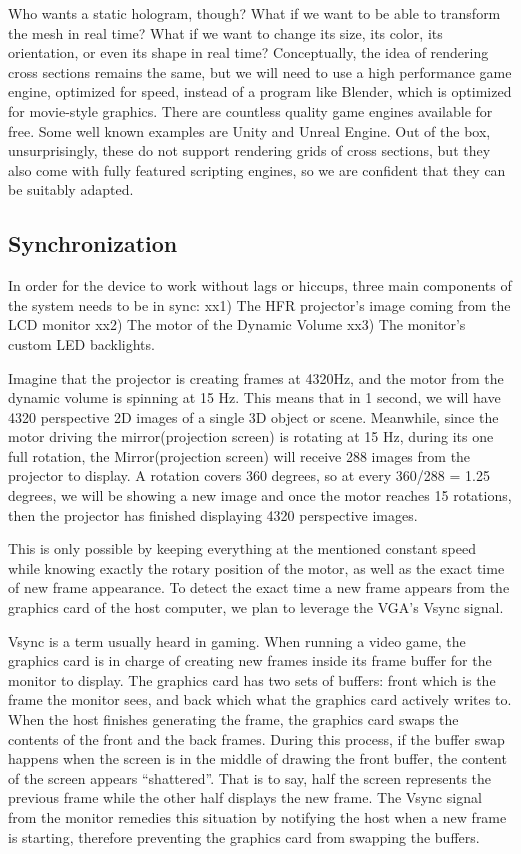 \documentclass[12pt]{article}
\begin{document}
Who wants a static hologram, though? What if we want to be able to transform the mesh in real time? What if we want to change its size, its color, its orientation, or even its shape in real time? Conceptually, the idea of rendering cross sections remains the same, but we will need to use a high performance game engine, optimized for speed, instead of a program like Blender, which is optimized for movie-style graphics. There are countless quality game engines available for free. Some well known examples are Unity and Unreal Engine. Out of the box, unsurprisingly, these do not support rendering grids of cross sections, but they also come with fully featured scripting engines, so we are confident that they can be suitably adapted.

\subsection{Synchronization}
In order for the device to work without lags or hiccups, three main components of the system needs to be in sync: 
xx1) The HFR projector’s image coming from the LCD monitor
xx2) The motor of the Dynamic Volume
xx3) The monitor’s custom LED backlights.

Imagine that the projector is creating frames at 4320Hz, and the motor from the dynamic volume is spinning at 15 Hz. This means that in 1 second, we will have 4320 perspective 2D images of a single 3D object or scene. Meanwhile, since the motor driving the mirror(projection screen) is rotating at 15 Hz, during its one full rotation, the Mirror(projection screen) will receive 288 images from the projector to display. A rotation covers 360 degrees, so at every 360/288 = 1.25 degrees, we will be showing a new image and  once the motor reaches 15 rotations, then the projector has finished displaying 4320 perspective images.

This is only possible by keeping everything at the mentioned constant speed while knowing exactly the rotary position of the motor, as well as the exact time of new frame appearance.  
To detect the exact time a new frame appears from the graphics card of the host computer, we plan to leverage the VGA’s Vsync signal. 

Vsync is a term usually heard in gaming. When running a video game, the graphics card is in charge of creating new frames inside its frame buffer for the monitor to display. The graphics card has two sets of buffers: front which is the frame the monitor sees, and back which what the graphics card actively writes to. When the host finishes generating the frame, the graphics card swaps the contents of the front and the back frames. During this process, if the buffer swap happens when the screen is in the middle of drawing the front buffer, the content of the screen appears “shattered”.  That is to say, half the screen represents the previous frame while the other half displays the new frame. The Vsync signal from the monitor remedies this situation by notifying the host when a new frame is starting, therefore preventing the graphics card from swapping the buffers.
\end{document}
